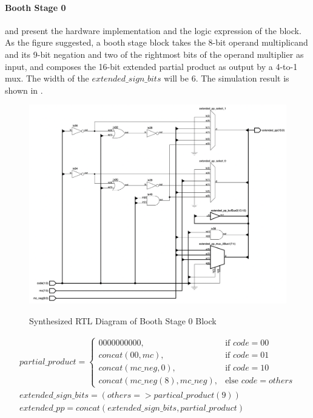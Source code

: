 \paragraph{Booth Stage 0}
 and  present the hardware implementation and the logic expression of the block.
As the figure suggested, a booth stage block takes the 8-bit operand multiplicand and its 9-bit negation and two of the rightmost bits of the operand multiplier
as input, and composes the 16-bit extended partial product as output by a 4-to-1 mux. The width of the \(extended\_sign\_bits\) will be 6.
The simulation result is shown in .

\begin{figure}[!ht]
	\centering
	\caption{Synthesized RTL Diagram of Booth Stage 0 Block}
	\includegraphics[width=\textwidth]{../img/booth_stage_0_rtl.png}
	\label{fig:booth_stage_0_rtl}
\end{figure}

\clearpage

\begin{equation}
	\begin{array}{c}
		partial\_product =
		\begin{cases}
			0000000000,                 & \text{if } code = 00       \\
			concat(00, mc),             & \text{if } code = 01       \\
			concat(mc\_neg, 0),         & \text{if } code = 10       \\
			concat(mc\_neg(8),mc\_neg), & \text{else } code = others
		\end{cases} \\
		extended\_sign\_bits = (others => partical\_product(9))  \\
		extended\_pp = concat(extended\_sign\_bits, partial\_product)
	\end{array}
	\label{exp:booth_stage_0}
\end{equation}

